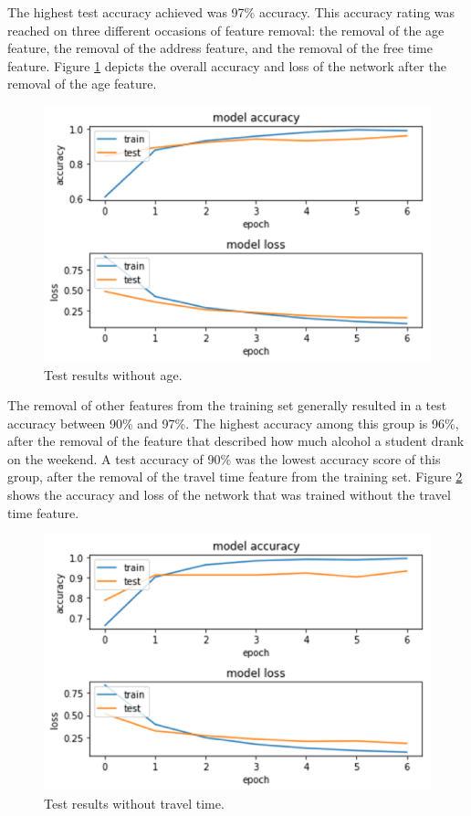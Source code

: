 \documentclass[conference]{IEEEtran}
\begin{document}
The highest test accuracy achieved was 97\% accuracy. This accuracy rating was reached on three different occasions of feature removal: the removal of the age feature, the removal of the address feature, and the removal of the free time feature. Figure \ref{results4} depicts the overall accuracy and loss of the network after the removal of the age feature.

\begin{figure}[htbp]
\centerline{\includegraphics[width=\linewidth]{results4.png}}
\caption{Test results without age.}
\label{results4}
\end{figure}

The removal of other features from the training set generally resulted in a test accuracy between 90\% and 97\%. The highest accuracy among this group is 96\%, after the removal of the feature that described how much alcohol a student drank on the weekend. A test accuracy of 90\% was the lowest accuracy score of this group, after the removal of the travel time feature from the training set. Figure \ref{results5} shows the accuracy and loss of the network that was trained without the travel time feature.

\begin{figure}[htbp]
\centerline{\includegraphics[width=\linewidth]{results5.png}}
\caption{Test results without travel time.}
\label{results5}
\end{figure}
\end{document}
